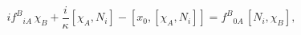 \begin{equation}\label{d3}
 i f^{B}{}_{i A}\, \chi_B+\frac{i}\kappa [\chi_A,N_i]- [x_0,
[\chi_A, N_i]] =f^{B}{}_{0 A}\, [N_i, \chi_B],
\end{equation}

